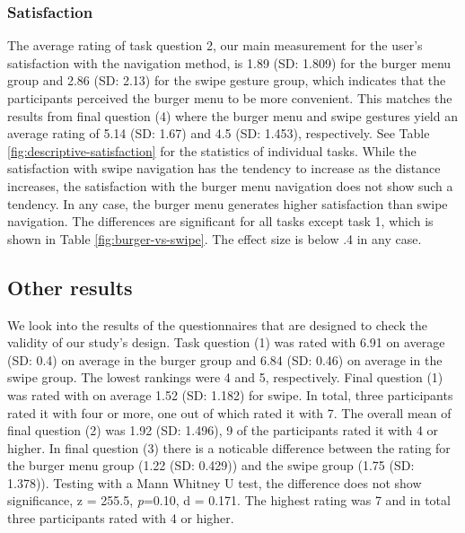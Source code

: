 \documentclass{sig-alternate-05-2015}
\begin{document}
\subsubsection{Satisfaction}
The average rating of task question 2, our main measurement for the user's satisfaction with the navigation method, is 1.89 (SD: 1.809) for the burger menu group and 2.86 (SD: 2.13)
for the swipe gesture group, which indicates that the participants perceived the burger menu to be more convenient. This matches the results from final question (4) 
where the burger menu and swipe gestures yield an average rating of 5.14  (SD: 1.67) and 4.5 (SD: 1.453), respectively.
See Table \ref{fig:descriptive-satisfaction} for the statistics of individual tasks. While the satisfaction with swipe navigation has the tendency to increase as the distance increases,
the satisfaction with the burger menu navigation does not show such a tendency. In any case, the burger menu generates higher satisfaction than swipe navigation. The differences are 
significant for all tasks except task 1, which is shown in Table \ref{fig:burger-vs-swipe}. The effect size is below .4 in any case.
\begin{table}[!h]
\centering
\caption{Mean (standard deviation) of satisfaction}
\label{fig:descriptive-satisfaction}
\end{table}

\subsection{Other results}
We look into
the results of the questionnaires that are designed to check the validity of our study's design. Task question (1) was rated with
6.91 on average (SD: 0.4) on average in the burger group and 6.84 (SD: 0.46) on average in the swipe group. The lowest rankings were
4 and 5, respectively.
Final question (1) was rated with on average 1.52 (SD: 1.182) for swipe. In total, three participants rated
it with four or more, one out of which rated it with 7. The overall mean of final question (2) was 1.92 (SD: 1.496), 9 of the participants rated it
with 4 or higher. In final question (3) there is a noticable difference between the rating for the burger menu group (1.22 (SD: 0.429)) and the swipe group
(1.75 (SD: 1.378)). Testing with a Mann Whitney U test, the difference does not show significance, z = 255.5, \emph{p}=0.10, d = 0.171. The highest rating was 7
and in total three participants rated with 4 or higher.
\end{document}
